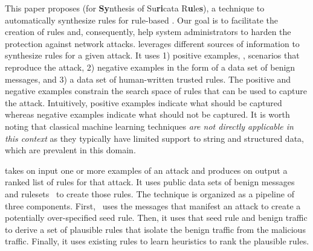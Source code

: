 \documentclass[conference]{IEEEtran}
\begin{document}

\sloppy This paper proposes \tname{} (for \textbf{Sy}nthesis of
Su\textbf{ri}cata R\textbf{u}le\textbf{s}), a technique to
automatically synthesize rules for rule-based \nids. Our goal is to
facilitate the creation of rules and, consequently, help system
administrators to harden the protection against network attacks.
\tname{} leverages different sources of information to synthesize
rules for a given attack. It uses 1) positive examples, \ie{},
scenarios that reproduce the attack, 2) negative examples in the form
of a data set of benign messages, and 3) a data set of human-written
trusted rules. The positive and negative examples constrain the search
space of rules that can be used to capture the attack. Intuitively,
positive examples indicate what should be captured whereas negative
examples indicate what should not be captured. It is worth noting that
classical machine learning techniques \emph{are not directly
  applicable in this context} as they typically have limited support
to string and structured data, which are prevalent in this domain.



\tname{} takes on input one or more examples  of an attack and produces
on output a ranked list of rules for that attack. It uses public data
sets of benign messages~\cite{tcpreplay,stratosphere-normal} and
rulesets~\cite{emerging-threats-open} to create those rules. The
technique is organized as a pipeline of three components. First,
\tname\ uses the messages that manifest an attack to create a
potentially over-specified seed rule. Then, it uses that seed rule and
benign traffic to derive a set of plausible rules that isolate the
benign traffic from the malicious traffic. Finally, it uses existing
rules to learn heuristics to rank the plausible rules.
\end{document}
